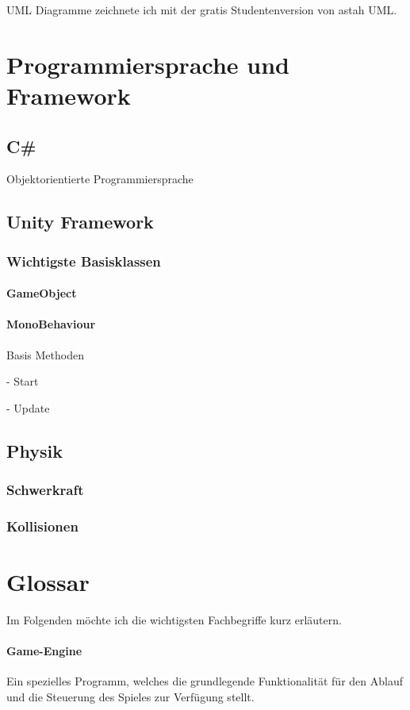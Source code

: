 UML Diagramme zeichnete ich mit der gratis Studentenversion von astah UML.

\section{Programmiersprache und Framework}

\subsection{C\#}

Objektorientierte Programmiersprache

\subsection{Unity Framework}

\subsubsection{Wichtigste Basisklassen}

\paragraph{GameObject}

\paragraph{MonoBehaviour}

Basis Methoden

- Start

- Update

\subsection{Physik}

\subsubsection{Schwerkraft}

\subsubsection{Kollisionen}
\label{subsubsec:collider}

\section{Glossar}

Im Folgenden möchte ich die wichtigsten Fachbegriffe kurz erläutern. 

\paragraph{Game-Engine}
Ein spezielles Programm, welches die grundlegende Funktionalität für den Ablauf und die Steuerung des Spieles zur Verfügung stellt.



